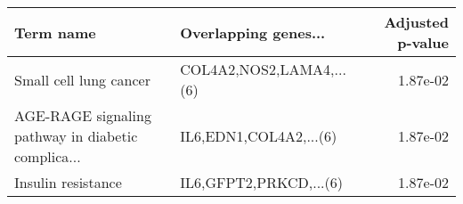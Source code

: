 \begin{tabular}{llr}
\toprule
                                         Term name &     Overlapping genes... &  Adjusted p-value \\
\midrule
                            Small cell lung cancer & COL4A2,NOS2,LAMA4,...(6) &          1.87e-02 \\
AGE-RAGE signaling pathway in diabetic complica... &   IL6,EDN1,COL4A2,...(6) &          1.87e-02 \\
                                Insulin resistance &   IL6,GFPT2,PRKCD,...(6) &          1.87e-02 \\
\bottomrule
\end{tabular}
